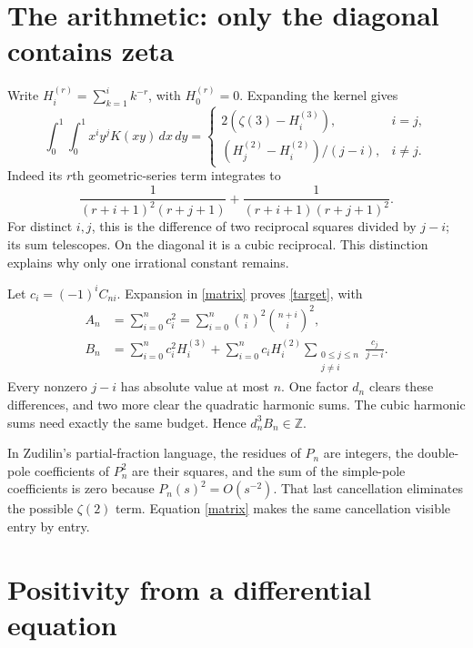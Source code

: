 \documentclass[11pt]{article}
\newcommand{\Z}{\mathbb Z}
\newcommand{\dd}{\,d}
\begin{document}
\section{The arithmetic: only the diagonal contains zeta}
Write $H_i^{(r)}=\sum_{k=1}^i k^{-r}$, with $H_0^{(r)}=0$. Expanding the kernel gives
\begin{equation}\label{matrix}
 \int_0^1\!\int_0^1x^iy^jK(xy)\dd x\dd y=
 \begin{cases}
 2(\zeta(3)-H_i^{(3)}),&i=j,\\[1mm]
 (H_j^{(2)}-H_i^{(2)})/(j-i),&i\ne j.
 \end{cases}
\end{equation}
Indeed its $r$th geometric-series term integrates to
\[
 \frac1{(r+i+1)^2(r+j+1)}+
 \frac1{(r+i+1)(r+j+1)^2}.
\]
For distinct $i,j$, this is the difference of two reciprocal squares divided by $j-i$; its sum telescopes. On the diagonal it is a cubic reciprocal. This distinction explains why only one irrational constant remains.

Let $c_i=(-1)^iC_{ni}$. Expansion in \eqref{matrix} proves \eqref{target}, with
\begin{align}
 A_n&=\sum_{i=0}^n c_i^2=\sum_{i=0}^n\binom ni^2\binom{n+i}i^2,\label{A}\\
 B_n&=\sum_{i=0}^n c_i^2H_i^{(3)}+
 \sum_{i=0}^n c_iH_i^{(2)}
          \sum_{\substack{0\le j\le n\\j\ne i}}\frac{c_j}{j-i}.
 \label{B}
\end{align}
Every nonzero $j-i$ has absolute value at most $n$. One factor $d_n$ clears these differences, and two more clear the quadratic harmonic sums. The cubic harmonic sums need exactly the same budget. Hence $d_n^3B_n\in\Z$.

In Zudilin's partial-fraction language, the residues of $P_n$ are integers, the double-pole coefficients of $P_n^2$ are their squares, and the sum of the simple-pole coefficients is zero because $P_n(s)^2=O(s^{-2})$. That last cancellation eliminates the possible $\zeta(2)$ term. Equation \eqref{matrix} makes the same cancellation visible entry by entry.

\section{Positivity from a differential equation}
\end{document}
